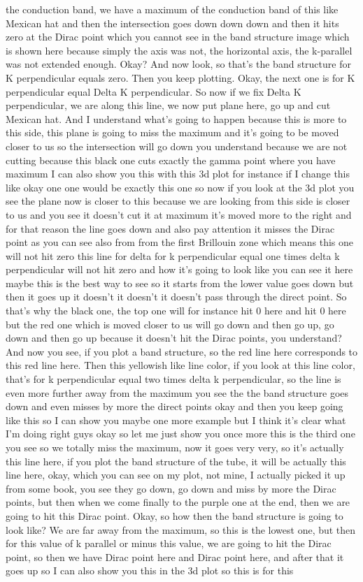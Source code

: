 the conduction band, we have a maximum of the conduction band of this like Mexican hat and then the intersection goes down down down and then it hits zero at the Dirac point which you cannot see in the band structure image which is shown here because simply the axis was not, the horizontal axis, the k-parallel was not extended enough. Okay? And now look, so that's the band structure for K perpendicular equals zero. Then you keep plotting. Okay, the next one is for K perpendicular equal Delta K perpendicular. So now if we fix Delta K perpendicular, we are along this line, we now put plane here, go up and cut Mexican hat. And I understand what's going to happen because this is more to this side, this plane is going to miss the maximum and it's going to be moved closer to us so the intersection will go down you understand because we are not cutting because this black one cuts exactly the gamma point where you have maximum I can also show you this with this 3d plot for instance if I change this like okay one one would be exactly this one so now if you look at the 3d plot you see the plane now is closer to this because we are looking from this side is closer to us and you see it doesn't cut it at maximum it's moved more to the right and for that reason the line goes down and also pay attention it misses the Dirac point as you can see also from from the first Brillouin zone which means this one will not hit zero this line for delta for k perpendicular equal one times delta k perpendicular will not hit zero and how it's going to look like you can see it here maybe this is the best way to see so it starts from the lower value goes down but then it goes up it doesn't it doesn't it doesn't pass through the direct point. So that's why the black one, the top one will for instance hit 0 here and hit 0 here but the red one which is moved closer to us will go down and then go up, go down and then go up because it doesn't hit the Dirac points, you understand? And now you see, if you plot a band structure, so the red line here corresponds to this red line here. Then this yellowish like line color, if you look at this line color, that's for k perpendicular equal two times delta k perpendicular, so the line is even more further away from the maximum you see the the band structure goes down and even misses by more the direct points okay and then you keep going like this so I can show you maybe one more example but I think it's clear what I'm doing right guys okay so let me just show you once more this is the third one you see so we totally miss the maximum, now it goes very very, so it's actually this line here, if you plot the band structure of the tube, it will be actually this line here, okay, which you can see on my plot, not mine, I actually picked it up from some book, you see they go down, go down and miss by more the Dirac points, but then when we come finally to the purple one at the end, then we are going to hit this Dirac point. Okay, so how then the band structure is going to look like? We are far away from the maximum, so this is the lowest one, but then for this value of k parallel or minus this value, we are going to hit the Dirac point, so then we have Dirac point here and Dirac point here, and after that it goes up so I can also show you this in the 3d plot so this is for this 
